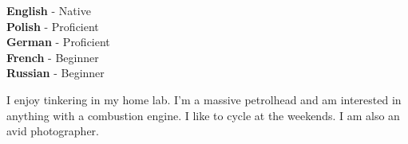 \documentclass[9pt]{developercv} %
\begin{document}

\begin{minipage}[t]{0.3\textwidth}
	\vspace{-\baselineskip} %

	
	\textbf{English} - Native \\
	\textbf{Polish} - Proficient \\
	\textbf{German} - Proficient \\
  \textbf{French} - Beginner \\
  \textbf{Russian} - Beginner
\end{minipage}
\hfill
\begin{minipage}[t]{0.5\textwidth}
	\vspace{-\baselineskip} %
	
	
	I enjoy tinkering in my home lab.
  I'm a massive petrolhead and am interested in anything with a combustion engine.
  I like to cycle at the weekends.
  I am also an avid photographer.
\end{minipage}
\hfill
\begin{minipage}[t]{0.5\textwidth}
	\vspace{-\baselineskip} %
	
\end{minipage}

\end{document}
